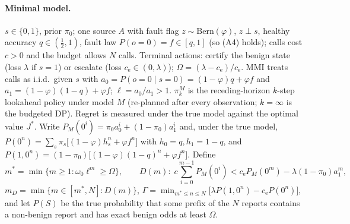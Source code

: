 \paragraph{Minimal model.} $s\in\{0,1\}$, prior $\pi_0$; one source $A$ with fault flag $z\sim\mathrm{Bern}(\varphi)$,
$z\perp s$, healthy accuracy $q\in(\frac12,1)$, fault law $P(o=0)=f\in[q,1]$ (so (A4) holds); calls cost $c>0$ and the
budget allows $N$ calls. Terminal actions: certify the benign state (loss $\lambda$ if $s=1$) or escalate (loss
$c_{\mathrm e}\in(0,\lambda)$); $\Omega=(\lambda-c_{\mathrm e})/c_{\mathrm e}$. MMI treats calls as i.i.d.\ given $s$ with
$a_0=P(o=0\mid s=0)=(1-\varphi)q+\varphi f$ and $a_1=(1-\varphi)(1-q)+\varphi f$; $\ell=a_0/a_1>1$.
$\pi^{M}_k$ is the receding-horizon $k$-step lookahead policy under model $M$ (re-planned after every observation;
$k=\infty$ is the budgeted DP). Regret is measured under the true model against the optimal value $J^*$.
Write $P_M(0^i)=\pi_0a_0^i+(1-\pi_0)a_1^i$ and, under the true model,
$P(0^n)=\sum_{s}\pi_s\big[(1-\varphi)h_s^n+\varphi f^n\big]$ with $h_0=q,h_1=1-q$, and $P(1,0^n)=(1-\pi_0)\big[(1-\varphi)(1-q)^n+\varphi f^n\big]$.
Define
\[
m^*=\min\{m\ge1:\omega_0\ell^m\ge\Omega\},\qquad
D(m):\; c\sum_{i=0}^{m-1}P_M(0^i)<c_{\mathrm e}P_M(0^m)-\lambda(1-\pi_0)a_1^m,
\]
$m_D=\min\{m\in[m^*,N]:D(m)\}$, $\Gamma=\min_{m^*\le n\le N}\big[\lambda P(1,0^n)-c_{\mathrm e}P(0^n)\big]$, and let $P(S)$ be the
true probability that some prefix of the $N$ reports contains a non-benign report and has exact benign odds at least $\Omega$.

